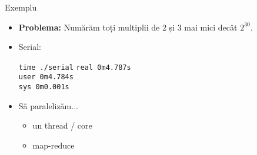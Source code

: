 \documentclass{beamer}
\begin{document}
\begin{frame}{Exemplu}
  \begin{itemize}
    \item \textbf{Problema:} Numărăm toți multiplii de 2 și 3 mai mici decât
    $2^{30}$.
    \item Serial: \\
      \begin{beamerboxesrounded}[lower=block
      body,shadow=true,width=0.3\textwidth]{\texttt{time ./serial}}
	\texttt{real  0m4.787s\\
	user  0m4.784s\\
	sys 0m0.001s\\}
      \end{beamerboxesrounded}
    \item Să paralelizăm...
      \begin{itemize}
	\item un thread / core
	\item map-reduce
      \end{itemize}
  \end{itemize}
\end{frame}
\end{document}
